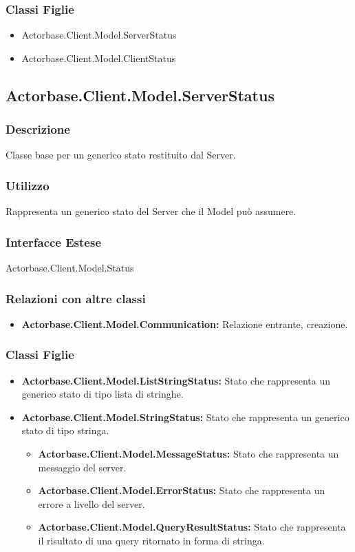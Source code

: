 \documentclass[a4paper]{article}
\begin{document}
			\subsubsection{Classi Figlie}
				\begin{itemize}
					\item Actorbase.Client.Model.ServerStatus
					\item Actorbase.Client.Model.ClientStatus		
				\end{itemize}
			
		\subsection{Actorbase.Client.Model.ServerStatus}
			\subsubsection{Descrizione}
				Classe base per un generico stato restituito dal Server.
			\subsubsection{Utilizzo}
				Rappresenta un generico stato del Server che il Model può assumere.
			\subsubsection{Interfacce Estese}
				Actorbase.Client.Model.Status
			\subsubsection{Relazioni con altre classi}
				\begin{itemize}
					\item \textbf{Actorbase.Client.Model.Communication:} Relazione entrante, creazione.
				\end{itemize}
			\subsubsection{Classi Figlie}
				\begin{itemize}
					\item \textbf{Actorbase.Client.Model.ListStringStatus:}
						Stato che rappresenta un generico stato di tipo lista di stringhe.
					\item \textbf{Actorbase.Client.Model.StringStatus:}
						Stato che rappresenta un generico stato di tipo stringa.
					\begin{itemize}
						\item \textbf{Actorbase.Client.Model.MessageStatus:}
							Stato che rappresenta un messaggio del server.
						\item \textbf{Actorbase.Client.Model.ErrorStatus:}
							Stato che rappresenta un errore a livello del server.
						\item \textbf{Actorbase.Client.Model.QueryResultStatus:}
							Stato che rappresenta il risultato di una query ritornato in forma di stringa.
					\end{itemize}
				\end{itemize}
				
\end{document}
